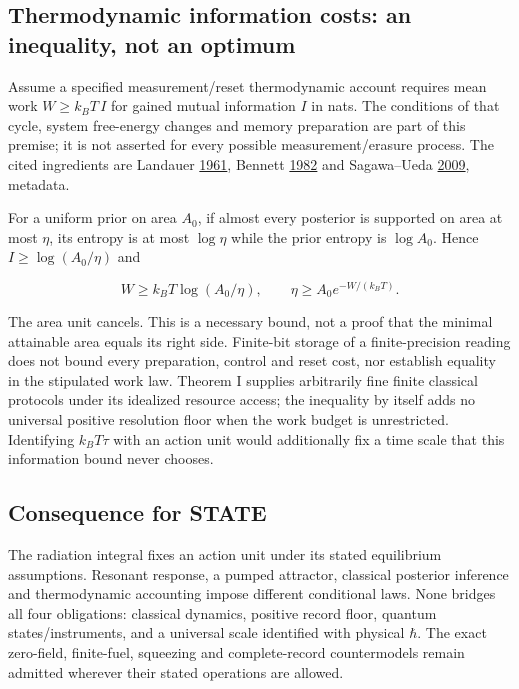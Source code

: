 \documentclass[11pt,a4paper]{article}
\begin{document}
\hypertarget{thermodynamic-information-costs-an-inequality-not-an-optimum}{%
\subsection{Thermodynamic information costs: an inequality, not an
optimum}\label{thermodynamic-information-costs-an-inequality-not-an-optimum}}

Assume a specified measurement/reset thermodynamic account requires mean
work \(W\ge k_BT\,I\) for gained mutual information \(I\) in nats. The
conditions of that cycle, system free-energy changes and memory
preparation are part of this premise; it is not asserted for every
possible measurement/erasure process. The cited ingredients are Landauer
\href{https://doi.org/10.1147/rd.53.0183}{1961}, Bennett
\href{https://doi.org/10.1007/BF02084158}{1982} and Sagawa--Ueda
\href{https://doi.org/10.1103/PhysRevLett.102.250602}{2009}, metadata.

For a uniform prior on area \(A_0\), if almost every posterior is
supported on area at most \(\eta\), its entropy is at most \(\log\eta\)
while the prior entropy is \(\log A_0\). Hence \(I\ge\log(A_0/\eta)\)
and

\[W\ge k_BT\log(A_0/\eta),\qquad
\eta\ge A_0e^{-W/(k_BT)}.\]

The area unit cancels. This is a necessary bound, not a proof that the
minimal attainable area equals its right side. Finite-bit storage of a
finite-precision reading does not bound every preparation, control and
reset cost, nor establish equality in the stipulated work law. Theorem I
supplies arbitrarily fine finite classical protocols under its idealized
resource access; the inequality by itself adds no universal positive
resolution floor when the work budget is unrestricted. Identifying
\(k_BT\tau\) with an action unit would additionally fix a time scale
that this information bound never chooses.

\hypertarget{consequence-for-state}{%
\subsection{Consequence for STATE}\label{consequence-for-state}}

The radiation integral fixes an action unit under its stated equilibrium
assumptions. Resonant response, a pumped attractor, classical posterior
inference and thermodynamic accounting impose different conditional
laws. None bridges all four obligations: classical dynamics, positive
record floor, quantum states/instruments, and a universal scale
identified with physical \(\hbar\). The exact zero-field, finite-fuel,
squeezing and complete-record countermodels remain admitted wherever
their stated operations are allowed.
\end{document}

